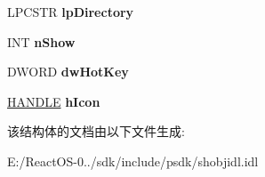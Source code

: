 \begin{DoxyCompactItemize}
L\+P\+C\+S\+TR {\bfseries lp\+Directory}
\item 
\mbox{\label{struct_i_context_menu_1_1tag_c_m_i_n_v_o_k_e_c_o_m_m_a_n_d_i_n_f_o_a3605f1475b7b6501bdbc66d8f1a6a95e}} 
I\+NT {\bfseries n\+Show}
\item 
\mbox{\label{struct_i_context_menu_1_1tag_c_m_i_n_v_o_k_e_c_o_m_m_a_n_d_i_n_f_o_a87eae92d9a84e84b8ca5bb855b729412}} 
D\+W\+O\+RD {\bfseries dw\+Hot\+Key}
\item 
\mbox{\label{struct_i_context_menu_1_1tag_c_m_i_n_v_o_k_e_c_o_m_m_a_n_d_i_n_f_o_a88ef3ebfcceb6b2bb1d0dd6049d99024}} 
\hyperlink{interfacevoid}{H\+A\+N\+D\+LE} {\bfseries h\+Icon}
\end{DoxyCompactItemize}


该结构体的文档由以下文件生成\+:\begin{DoxyCompactItemize}
\item 
E\+:/\+React\+O\+S-\/0../sdk/include/psdk/shobjidl.\+idl\end{DoxyCompactItemize}
